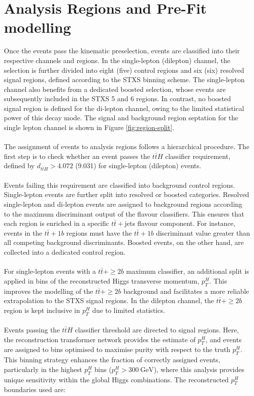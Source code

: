 \section{Analysis Regions and Pre-Fit modelling}
Once the events pass the kinematic preselection, events are classified into their respective channels and regions. In the single-lepton (dilepton) channel, the selection is further divided into eight (five) control regions and six (six) resolved signal regions, defined according to the STXS binning scheme. The single-lepton channel also benefits from a dedicated boosted selection, whose events are subsequently included in the STXS 5 and 6 regions. In contrast, no boosted signal region is defined for the di-lepton channel, owing to the limited statistical power of this decay mode. The signal and background region septation for the single lepton channel is shown in Figure \ref{fig:region-split}.\\
\\
The assignment of events to analysis regions follows a hierarchical procedure.  
The first step is to check whether an event passes the $t\bar{t}H$ classifier requirement, defined by $d_{t\bar{t}H} > 4.072$ (9.031) for single-lepton (dilepton) events.\\
\\
Events failing this requirement are classified into background control regions. Single-lepton events are further split into resolved or boosted categories. Resolved single-lepton and di-lepton events are assigned to background regions according to the maximum discriminant output of the flavour classifiers. This ensures that each region is enriched in a specific $t\bar{t}+$jets flavour component. For instance, events in the $t\bar{t}+1b$ regions must have the $t\bar{t}+1b$ discriminant value greater than all competing background discriminants. Boosted events, on the other hand, are collected into a dedicated control region.\\
\\
For single-lepton events with a $t\bar{t}+\geq 2b$ maximum classifier, an additional split is applied in bins of the reconstructed Higgs transverse momentum, $p_{T}^{H}$. This improves the modelling of the $t\bar{t}+\geq 2b$ background and facilitates a more reliable extrapolation to the STXS signal regions. In the dilepton channel, the $t\bar{t}+\geq 2b$ region is kept inclusive in $p_{T}^{H}$ due to limited statistics.\\
\\
Events passing the $t\bar{t}H$ classifier threshold are directed to signal regions. Here, the reconstruction transformer network provides the estimate of $p_{T}^{H}$, and events are assigned to bins optimised to maximise purity with respect to the truth $p_{T}^{H}$. This binning strategy enhances the fraction of correctly assigned events, particularly in the highest $p_{T}^{H}$ bins ($p_{T}^{H} > 300~\text{GeV}$), where this analysis provides unique sensitivity within the global Higgs combinations. The reconstructed $p_{T}^{H}$ boundaries used are:
